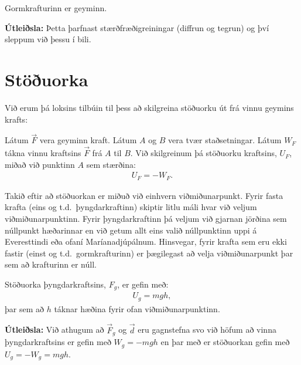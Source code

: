 \ifdefined \wholebook \else\documentclass[oneside]{book}\usepackage{EdlBook}\graphicspath{{figures/}}
\begin{document}
\begin{tcolorbox}
\begin{theorem}
Gormkrafturinn er geyminn.
\end{theorem}
\end{tcolorbox}

\textbf{Útleiðsla:} Þetta þarfnast stærðfræðigreiningar (diffrun og tegrun) og því sleppum við þessu í bili.


\section{Stöðuorka}

Við erum þá loksins tilbúin til þess að skilgreina stöðuorku út frá vinnu geymins krafts:

\begin{tcolorbox}
\begin{definition}
Látum $\Vec{F}$ vera geyminn kraft. Látum $A$ og $B$ vera tvær staðsetningar. Látum $W_F$ tákna vinnu kraftsins $\vec{F}$ frá $A$ til $B$. Við skilgreinum þá stöðuorku kraftsins, $U_F$, miðað við punktinn $A$ sem stærðina:
\begin{align*}
    U_F = -W_F.
\end{align*}
\end{definition}
\end{tcolorbox}
Takið eftir að stöðuorkan er miðuð við einhvern viðmiðunarpunkt. Fyrir fasta krafta (eins og t.d.~þyngdarkraftinn) skiptir litlu máli hvar við veljum viðmiðunarpunktinn. Fyrir þyngdarkraftinn þá veljum við gjarnan jörðina sem núllpunkt hæðarinnar en við getum allt eins valið núllpunktinn uppi á Everesttindi eða ofaní Maríanadjúpálnum. Hinsvegar, fyrir krafta sem eru ekki fastir (einst og t.d.~gormkrafturinn) er þægilegast að velja viðmiðunarpunkt þar sem að krafturinn er núll.

\begin{tcolorbox}
\begin{theorem}
Stöðuorka þyngdarkraftsins, $F_g$, er gefin með:
\begin{align*}
    U_g = mgh,
\end{align*}
þar sem að $h$ táknar hæðina fyrir ofan viðmiðunarpunktinn.
\end{theorem}
\end{tcolorbox}

\textbf{Útleiðsla:} Við athugum að $\vec{F}_g$ og $\vec{d}$ eru gagnstefna svo við höfum að vinna þyngdarkraftsins er gefin með $W_g = -mgh$ en þar með er stöðuorkan gefin með $U_g = -W_g = mgh$.
\end{document}
